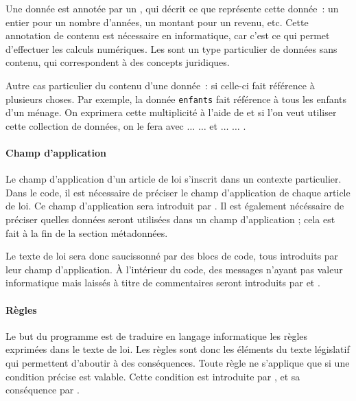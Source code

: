 Une donnée est annotée par un , qui décrit ce que représente cette donnée : un entier pour un nombre d’années, un montant pour un revenu, etc. Cette annotation de contenu est nécessaire en informatique, car c’est ce qui permet d’effectuer les calculs numériques. Les  sont un type particulier de données sans contenu, qui correspondent à des concepts juridiques.


Autre cas particulier du contenu d’une donnée : si celle-ci fait référence à plusieurs choses. Par exemple, la donnée \texttt{enfants} fait référence à tous les enfants d’un ménage. On exprimera cette multiplicité à l’aide de  et si l’on veut utiliser cette collection de données, on le fera avec  $\ldots$  $\ldots$  et  $\ldots$  $\ldots$ .

\paragraph{Champ d’application} Le champ d’application d’un article de loi s’inscrit dans un contexte particulier. Dans le code, il est nécessaire de préciser le champ d’application de chaque article de loi. Ce champ d’application sera introduit par . Il est également nécéssaire de préciser quelles données seront utilisées dans un champ d'application ; cela est fait à la fin de la section métadonnées.

Le texte de loi sera donc saucissonné par des blocs de code, tous introduits par leur champ d'application. À l'intérieur du code, des messages n'ayant pas valeur informatique mais laissés à titre de commentaires seront introduits par \cm{\#} et .

\paragraph{Règles} Le but du programme est de traduire en langage informatique les règles exprimées dans le texte de loi. Les règles sont donc les éléments du texte législatif qui permettent d’aboutir à des conséquences. Toute règle ne s’applique que si une condition précise est valable. Cette condition est introduite par , et sa conséquence par .

